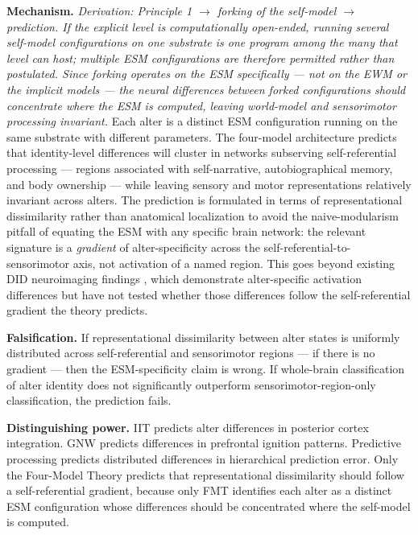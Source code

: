 \documentclass[12pt]{article}
\begin{document}
\textbf{Mechanism.} \emph{Derivation: Principle 1 $\rightarrow$ forking of the self-model $\rightarrow$ prediction. If the explicit level is computationally open-ended, running several self-model configurations on one substrate is one program among the many that level can host; multiple ESM configurations are therefore permitted rather than postulated. Since forking operates on the ESM specifically --- not on the EWM or the implicit models --- the neural differences between forked configurations should concentrate where the ESM is computed, leaving world-model and sensorimotor processing invariant.} Each alter is a distinct ESM configuration running on the same substrate with different parameters. The four-model architecture predicts that identity-level differences will cluster in networks subserving self-referential processing --- regions associated with self-narrative, autobiographical memory, and body ownership --- while leaving sensory and motor representations relatively invariant across alters. The prediction is formulated in terms of representational dissimilarity rather than anatomical localization to avoid the naive-modularism pitfall of equating the ESM with any specific brain network: the relevant signature is a \emph{gradient} of alter-specificity across the self-referential-to-sensorimotor axis, not activation of a named region. This goes beyond existing DID neuroimaging findings \citep{Reinders2003,Reinders2006,Schlumpf2014}, which demonstrate alter-specific activation differences but have not tested whether those differences follow the self-referential gradient the theory predicts.

\textbf{Falsification.} If representational dissimilarity between alter states is uniformly distributed across self-referential and sensorimotor regions --- if there is no gradient --- then the ESM-specificity claim is wrong. If whole-brain classification of alter identity does not significantly outperform sensorimotor-region-only classification, the prediction fails.

\textbf{Distinguishing power.} IIT predicts alter differences in posterior cortex integration. GNW predicts differences in prefrontal ignition patterns. Predictive processing predicts distributed differences in hierarchical prediction error. Only the Four-Model Theory predicts that representational dissimilarity should follow a self-referential gradient, because only FMT identifies each alter as a distinct ESM configuration whose differences should be concentrated where the self-model is computed.
\end{document}
